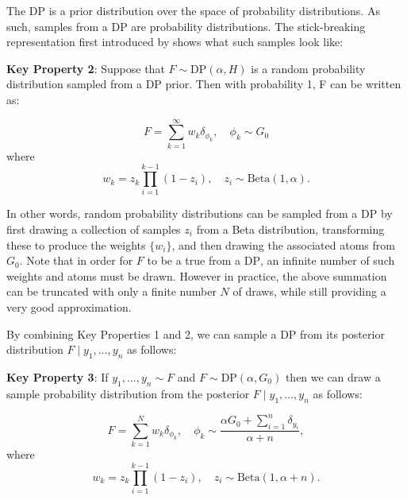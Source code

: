 \documentclass[nojss]{jss}
\begin{document}
The DP is a prior distribution over the space of probability distributions. As such, samples from a DP are probability distributions. The stick-breaking representation first introduced by \cite{sethuraman_constructive_1994} shows what such samples look like:

\begin{tcolorbox}

\textbf{Key Property 2}:
Suppose that $F \sim \text{DP} (\alpha, H)$ is a random probability distribution sampled from a DP prior. Then with probability 1, F can be written as:

$$F = \sum_{k=1}^\infty w_k \delta_{\phi_k}, \quad \phi_k \sim G_0$$
where
$$w_k = z_k \prod_{i=1}^{k-1} (1-z_i),\quad z_i \sim \text{Beta}(1,\alpha).$$

\end{tcolorbox}

In other words, random probability distributions can be sampled from a DP by first drawing a collection of samples ${z_i}$ from a Beta distribution, transforming these to produce the weights $\{w_i\}$, and then drawing the associated atoms from $G_0$. Note that in order for $F$ to be a true from a $\text{DP}$, an infinite number of such weights and atoms must be drawn. However in practice, the above summation can be truncated with only a finite number $N$ of draws, while still providing a very good approximation.

By combining Key Properties 1 and 2, we can sample a DP from its posterior distribution $F \mid y_1,\ldots,y_n$ as follows:

\begin{tcolorbox}

\textbf{Key Property 3}:  If $y_1,\ldots,y_n \sim F$ and $F \sim \text{DP} (\alpha, G_0)$ then we can draw a sample probability distribution from the posterior $F\mid y_1,\ldots,y_n$ as follows:

$$F = \sum_{k=1}^N w_k \delta_{\phi_k}, \quad \phi_k \sim \frac{\alpha G_0 + \sum_{i=1}^n \delta_{y_i}}{\alpha+n},$$
where
$$w_k = z_k \prod_{i=1}^{k-1} (1-z_i),\quad z_i \sim \text{Beta}(1,\alpha+n).$$

\end{tcolorbox}


\end{document}
